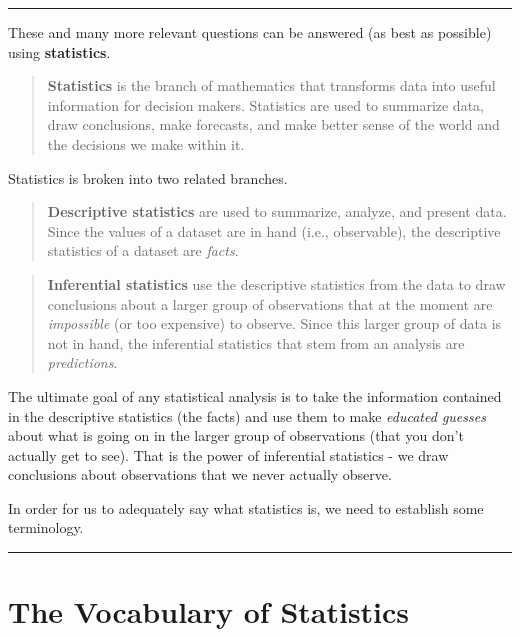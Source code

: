 \documentclass[
]{book}
\begin{document}
\begin{center}\rule{0.5\linewidth}{0.5pt}\end{center}

These and many more relevant questions can be answered (as best as possible) using \textbf{statistics}.

\begin{quote}
\textbf{Statistics} is the branch of mathematics that transforms data into useful information for decision makers. Statistics are used to summarize data, draw conclusions, make forecasts, and make better sense of the world and the decisions we make within it.
\end{quote}

Statistics is broken into two related branches.

\begin{quote}
\textbf{Descriptive statistics} are used to summarize, analyze, and present data. Since the values of a dataset are in hand (i.e., observable), the descriptive statistics of a dataset are \emph{facts}.
\end{quote}

\begin{quote}
\textbf{Inferential statistics} use the descriptive statistics from the data to draw conclusions about a larger group of observations that at the moment are \emph{impossible} (or too expensive) to observe. Since this larger group of data is not in hand, the inferential statistics that stem from an analysis are \emph{predictions}.
\end{quote}

The ultimate goal of any statistical analysis is to take the information contained in the descriptive statistics (the facts) and use them to make \emph{educated guesses} about what is going on in the larger group of observations (that you don't actually get to see). That is the power of inferential statistics - we draw conclusions about observations that we never actually observe.

In order for us to adequately say what statistics is, we need to establish some terminology.

\begin{center}\rule{0.5\linewidth}{0.5pt}\end{center}

\hypertarget{the-vocabulary-of-statistics}{%
\section{The Vocabulary of Statistics}\label{the-vocabulary-of-statistics}}
\end{document}
